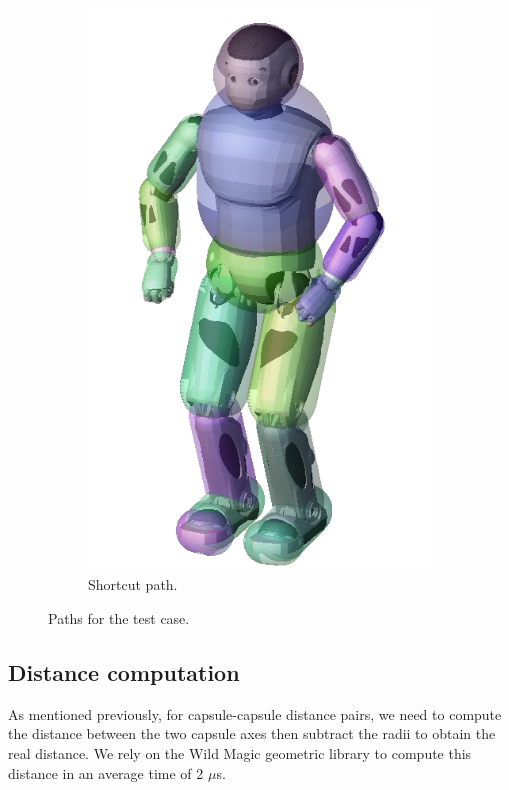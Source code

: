 \begin{figure}
\begin{subfigure}{0.48\columnwidth}
    \includegraphics[width = \columnwidth]
                    {src/chap3-optimal-motion-planning/figure/romeo-capsule.png}
    \caption{Shortcut path.}
    \label{simple-path-sol-shortcutb}
  \end{subfigure}
  \caption{Paths for the test case.}
\end{figure}

\subsection{Distance computation}
As mentioned previously, for capsule-capsule distance pairs, we need
to compute the distance between the two capsule axes then subtract the
radii to obtain the real distance. We rely on the Wild Magic geometric
library \cite{schneider2003geometric, wildmagic} to compute this
distance in an average time of 2 $\mu$s.

